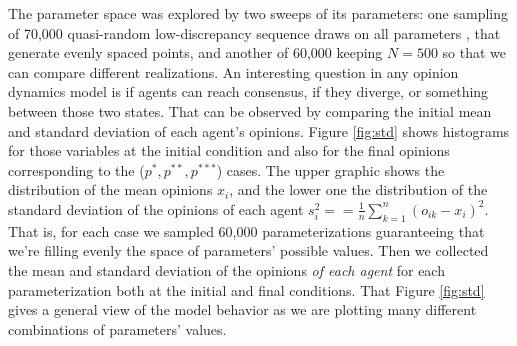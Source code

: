 \documentclass{article}
\begin{document}
The parameter space was explored by two sweeps of its parameters: one sampling
of 70,000 quasi-random low-discrepancy sequence draws on all parameters
\cite{saltelli2008global, saltelli2000sensitivity}, that generate evenly spaced
points, and another of 60,000 keeping \(N=500\) so that we can compare different
realizations. An interesting question in any opinion dynamics model is if agents
can reach consensus, if they diverge, or something between those two states.
That can be observed by comparing the initial mean and standard deviation of
each agent's opinions. Figure \ref{fig:std} shows histograms for those variables
at the initial condition and also for the final opinions corresponding to the
(\(p^{*}, p^{**}, p^{***}\)) cases. The upper graphic shows the distribution of
the mean opinions $x_i$, and the lower one the distribution of the standard
deviation of the opinions of each agent $s_i^2== \frac{1}{n} \sum_{k=1}^{n}
(o_{ik}-x_i)^2$. That is, for each case we sampled 60,000 parameterizations
guaranteeing that we're filling evenly the space of parameters' possible values.
Then we collected the mean and standard deviation of the opinions \textit{of
  each agent} for each parameterization both at the initial and final
conditions. That Figure \ref{fig:std} gives a general view of the model behavior
as we are plotting many different combinations of parameters' values.
\end{document}
